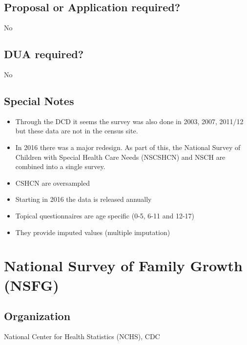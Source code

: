 \documentclass[
]{book}
\providecommand{\tightlist}{%
  \setlength{\itemsep}{0pt}\setlength{\parskip}{0pt}}
\begin{document}
\hypertarget{proposal-or-application-required-62}{%
\section{Proposal or Application required?}\label{proposal-or-application-required-62}}

No

\hypertarget{dua-required-62}{%
\section{DUA required?}\label{dua-required-62}}

No

\hypertarget{special-notes-62}{%
\section{Special Notes}\label{special-notes-62}}

\begin{itemize}
\tightlist
\item
  Through the DCD it seems the survey was also done in 2003, 2007, 2011/12 but these data are not in the census site.
\item
  In 2016 there was a major redesign. As part of this, the National Survey of Children with Special Health Care Needs (NSCSHCN) and NSCH are combined into a single survey.
\item
  CSHCN are oversampled
\item
  Starting in 2016 the data is released annually
\item
  Topical questionnaires are age specific (0-5, 6-11 and 12-17)
\item
  They provide imputed values (multiple imputation)
\end{itemize}

\mainmatter

\hypertarget{national-survey-of-family-growth-nsfg}{%
\chapter{National Survey of Family Growth (NSFG)}\label{national-survey-of-family-growth-nsfg}}

\hypertarget{organization-63}{%
\section{Organization}\label{organization-63}}

National Center for Health Statistics (NCHS), CDC
\end{document}
